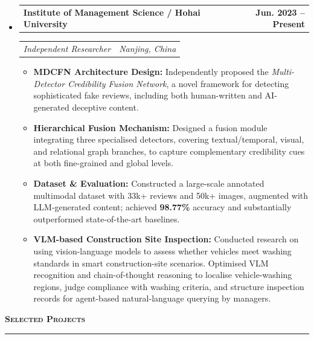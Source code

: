 \documentclass[11pt,letterpaper]{article}
\makeatletter
\newcommand{\cvsection}[1]{%
  \vspace{10pt} 
  {\noindent\Large\bfseries\scshape #1} 
  \par           
  \vspace{2pt}   
  \hrule         
  \vspace{6pt}   
}
\newcommand{\headerrow}[2]
{\begin{tabular*}{\linewidth}{l@{\extracolsep{\fill}}r}
#1 &
#2 \\
\end{tabular*}}
\makeatother
\begin{document}
\begin{itemize}
    \item 
    \headerrow
    {\textbf{Institute of Management Science / Hohai University}}
    {\textbf{Jun. 2023 -- Present}}
    \headerrow
    {\emph{Independent Researcher}}
    {\emph{Nanjing, China}}
    \begin{itemize}
        \item \textbf{MDCFN Architecture Design:} Independently proposed the \emph{Multi-Detector Credibility Fusion Network}, a novel framework for detecting sophisticated fake reviews, including both human-written and AI-generated deceptive content.
        \item \textbf{Hierarchical Fusion Mechanism:} Designed a fusion module integrating three specialised detectors, covering textual/temporal, visual, and relational graph branches, to capture complementary credibility cues at both fine-grained and global levels.
        \item \textbf{Dataset \& Evaluation:} Constructed a large-scale annotated multimodal dataset with 33k+ reviews and 50k+ images, augmented with LLM-generated content; achieved \textbf{98.77\%} accuracy and substantially outperformed state-of-the-art baselines.
        \item \textbf{VLM-based Construction Site Inspection:} Conducted research on using vision-language models to assess whether vehicles meet washing standards in smart construction-site scenarios. Optimised VLM recognition and chain-of-thought reasoning to localise vehicle-washing regions, judge compliance with washing criteria, and structure inspection records for agent-based natural-language querying by managers.
    \end{itemize}
\end{itemize}
\cvsection{Selected Projects}
\end{document}
